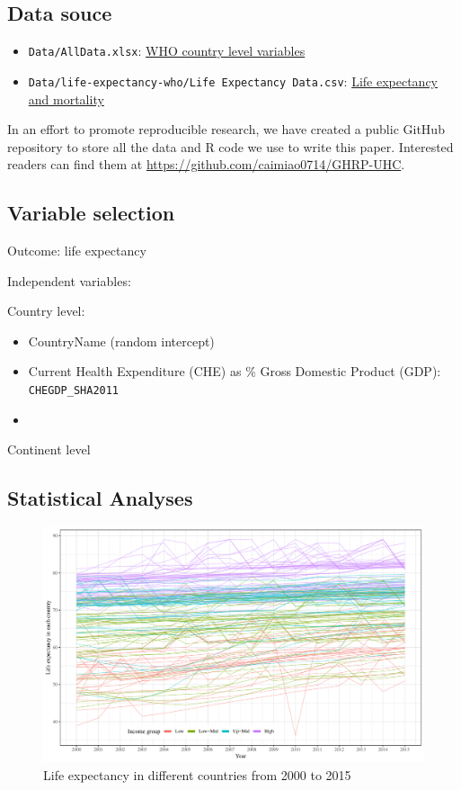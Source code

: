 \documentclass[]{elsarticle} %
\makeatletter
\providecommand{\tightlist}{%
  \setlength{\itemsep}{0pt}\setlength{\parskip}{0pt}}
\def\maxwidth{\ifdim\Gin@nat@width>\linewidth\linewidth
\else\Gin@nat@width\fi}
\let\Oldincludegraphics\includegraphics
\renewcommand{\includegraphics}[1]{\Oldincludegraphics[width=\maxwidth]{#1}}
\makeatother
\begin{document}
\hypertarget{data-souce}{%
\subsection{Data souce}\label{data-souce}}

\begin{itemize}
\tightlist
\item
  \texttt{Data/AllData.xlsx}: \href{http://apps.who.int/nha/database/Select/Indicators/en}{WHO country level variables}
\item
  \texttt{Data/life-expectancy-who/Life\ Expectancy\ Data.csv}: \href{https://www.kaggle.com/kumarajarshi/life-expectancy-who/data}{Life expectancy and mortality}
\end{itemize}

In an effort to promote reproducible research, we have created a public GitHub repository to store all the data and R code we use to write this paper.
Interested readers can find them at \url{https://github.com/caimiao0714/GHRP-UHC}.

\hypertarget{variable-selection}{%
\subsection{Variable selection}\label{variable-selection}}

Outcome: life expectancy

Independent variables:

Country level:

\begin{itemize}
\item
  CountryName (random intercept)
\item
  Current Health Expenditure (CHE) as \% Gross Domestic Product (GDP): \texttt{CHEGDP\_SHA2011}
\item
\end{itemize}

Continent level

\hypertarget{statistical-analyses}{%
\subsection{Statistical Analyses}\label{statistical-analyses}}

\begin{figure}
\centering
\includegraphics{Figures/fig1.pdf}
\caption{\label{fig:fig1}Life expectancy in different countries from 2000 to 2015}
\end{figure}
\end{document}
